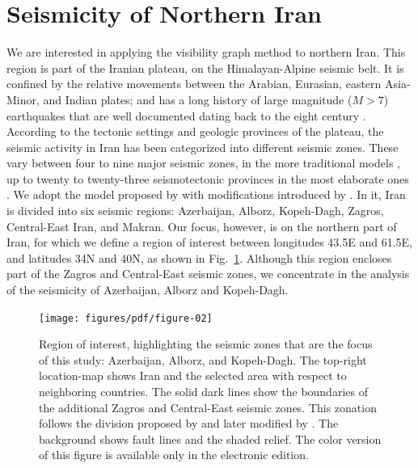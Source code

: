 
\section{Seismicity of Northern Iran}

We are interested in applying the visibility graph method to northern Iran. This region is part of the Iranian plateau, on the Himalayan-Alpine seismic belt. It is confined by the relative movements between the Arabian, Eurasian, eastern Asia-Minor, and Indian plates; and has a long history of large magnitude ($M>7$) earthquakes that are well documented dating back to the eight century \citep[e.g.,][]{Berberian_1981_Chap}. According to the tectonic settings and geologic provinces of the plateau, the seismic activity in Iran has been categorized into different seismic zones. These vary between four to nine major seismic zones, in the more traditional models \citep[e.g.,][]{Stocklin1968, Takin1972, Berberian1976}, up to twenty to twenty-three seismotectonic provinces in the most elaborate ones \citep[e.g.,][]{Nowroozi1976, Tavakoli1999}. We adopt the model proposed by \citet{Mirzaei1998} with modifications introduced by \citet{Karimiparidari2013}. In it, Iran is divided into six seismic regions: Azerbaijan, Alborz, Kopeh-Dagh, Zagros, Central-East Iran, and Makran. Our focus, however, is on the northern part of Iran, for which we define a region of interest between longitudes 43.5\textdegree{}E and 61.5\textdegree{}E, and latitudes 34\textdegree{}N and 40\textdegree{}N, as shown in Fig.~\ref{fig:study_region}. Although this region encloses part of the Zagros and Central-East seismic zones, we concentrate in the analysis of the seismicity of Azerbaijan, Alborz and Kopeh-Dagh.

\begin{figure}[t]
	\centering
	\texttt{[image: figures/pdf/figure-02]} 
	\caption{Region of interest, highlighting the seismic zones that are the focus of this study: Azerbaijan, Alborz, and Kopeh-Dagh. The top-right location-map shows Iran and the selected area with respect to neighboring countries. The solid dark lines show the boundaries of the additional Zagros and Central-East seismic zones. This zonation follows the division proposed by \citet{Mirzaei1998} and later modified by \citet{Karimiparidari2013}. The background shows fault lines and the shaded relief. The color version of this figure is available only in the electronic edition.}
	\label{fig:study_region}
\end{figure}

